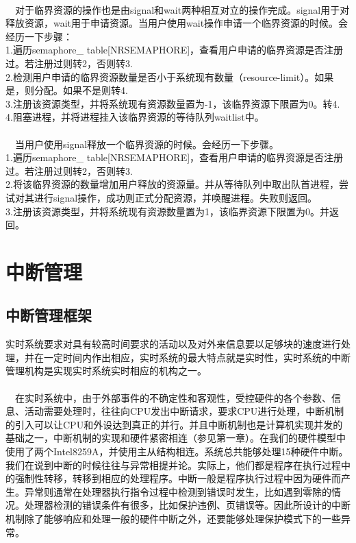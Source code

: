 \documentclass[UTF8,nofonts,cs4size]{ctexrep}
\begin{document}
\paragraph{}
\indent \ \ 对于临界资源的操作也是由signal和wait两种相互对立的操作完成。signal用于对释放资源，wait用于申请资源。当用户使用wait操作申请一个临界资源的时候。会经历一下步骤：
\\ \indent 1.遍历semaphore\_ table[NRSEMAPHORE]，查看用户申请的临界资源是否注册过。若注册过则转2，否则转3.
\\ \indent 2.检测用户申请的临界资源数量是否小于系统现有数量（resource-limit）。如果是，则分配。如果不是则转4.
\\ \indent 3.注册该资源类型，并将系统现有资源数量置为-1，该临界资源下限置为0。转4.
\\ \indent 4.阻塞进程，并将进程挂入该临界资源的等待队列waitlist中。
\paragraph{}
\indent \ \ 当用户使用signal释放一个临界资源的时候。会经历一下步骤。
\\ \indent 1.遍历semaphore\_ table[NRSEMAPHORE]，查看用户申请的临界资源是否注册过。若注册过则转2，否则转3.
\\ \indent 2.将该临界资源的数量增加用户释放的资源量。并从等待队列中取出队首进程，尝试对其进行signal操作，成功则正式分配资源，并唤醒进程。失败则返回。
\\ \indent 3.注册该资源类型，并将系统现有资源数量置为1，该临界资源下限置为0。并返回。


\section{中断管理}
\subsection{中断管理框架}
实时系统要求对具有较高时间要求的活动以及对外来信息要以足够块的速度进行处理，并在一定时间内作出相应，实时系统的最大特点就是实时性，实时系统的中断管理机构是实现实时系统实时相应的机构之一。
\paragraph{}
\indent \ \ 在实时系统中，由于外部事件的不确定性和客观性，受控硬件的各个参数、信息、活动需要处理时，往往向CPU发出中断请求，要求CPU进行处理，中断机制的引入可以让CPU和外设达到真正的并行。并且中断机制也是计算机实现并发的基础之一，中断机制的实现和硬件紧密相连（参见第一章）。在我们的硬件模型中使用了两个Intel8259A，并使用主从结构相连。系统总共能够处理15种硬件中断。我们在说到中断的时候往往与异常相提并论。实际上，他们都是程序在执行过程中的强制性转移，转移到相应的处理程序。中断一般是程序执行过程中因为硬件而产生。异常则通常在处理器执行指令过程中检测到错误时发生，比如遇到零除的情况。处理器检测的错误条件有很多，比如保护违例、页错误等。因此所设计的中断机制除了能够响应和处理一般的硬件中断之外，还要能够处理保护模式下的一些异常。
\end{document}
